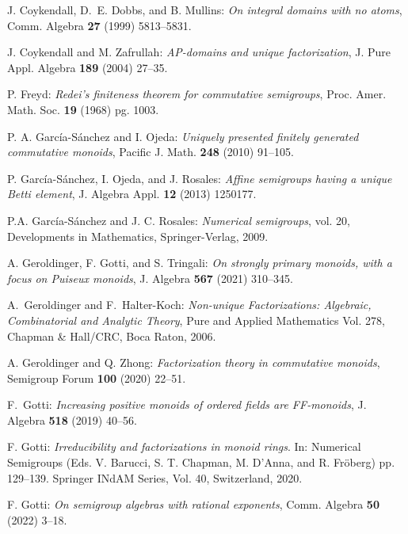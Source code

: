 \documentclass[12pt]{amsart}
\theoremstyle{definition}
\numberwithin{equation}{section}
\begin{document}
\begin{thebibliography}{20}
	 J. Coykendall, D.~E. Dobbs, and B. Mullins: \emph{On integral domains with no atoms}, Comm. Algebra \textbf{27} (1999) 5813--5831.


	 J. Coykendall and M. Zafrullah: \emph{AP-domains and unique factorization}, J. Pure Appl. Algebra \textbf{189} (2004) 27--35.

	 P. Freyd: \emph{Redei's finiteness theorem for commutative semigroups}, Proc. Amer. Math. Soc. \textbf{19} (1968) pg. 1003.

	 P. A. Garc\'ia-S\'anchez and I. Ojeda: \emph{Uniquely presented finitely generated commutative monoids}, Pacific J. Math. \textbf{248} (2010) 91--105.
	
	 P. Garc\'ia-S\'anchez, I. Ojeda, and J. Rosales: \emph{Affine semigroups having a unique Betti element}, J. Algebra Appl. \textbf{12} (2013) 1250177.

	 P.A. Garc\'ia-S\'anchez and J. C. Rosales: \emph{Numerical semigroups}, vol. 20, Developments in Mathematics, Springer-Verlag, 2009.
		
	 A. Geroldinger, F. Gotti, and S. Tringali: \emph{On strongly primary monoids, with a focus on Puiseux monoids}, J. Algebra \textbf{567} (2021) 310--345.
	
	 A.~Geroldinger and F.~Halter-Koch: \emph{Non-unique Factorizations: Algebraic, Combinatorial and Analytic Theory}, Pure and Applied Mathematics Vol. 278, Chapman \& Hall/CRC, Boca Raton, 2006.

	 A. Geroldinger and Q. Zhong: \emph{Factorization theory in commutative monoids}, Semigroup Forum \textbf{100} (2020) 22--51.


	 F.~Gotti: \emph{Increasing positive monoids of ordered fields are FF-monoids}, J. Algebra \textbf{518} (2019) 40--56.

	 F. Gotti: \emph{Irreducibility and factorizations in monoid rings}. In: Numerical Semigroups (Eds. V. Barucci, S. T. Chapman, M. D’Anna, and R. Fr\"oberg) pp. 129--139. Springer INdAM Series, Vol. 40, Switzerland, 2020.

	 F. Gotti: \emph{On semigroup algebras with rational exponents}, Comm. Algebra \textbf{50} (2022) 3--18.
	

\end{thebibliography}
\end{document}
